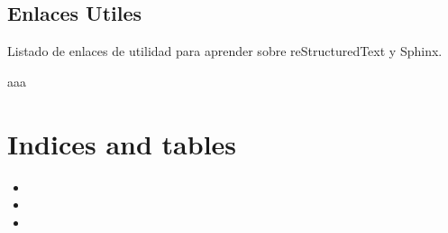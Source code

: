 \documentclass[letterpaper,10pt,spanish]{sphinxmanual}
\begin{document}
\chapter{Enlaces Utiles}
\label{anexo:enlaces-utiles}\label{anexo:id2}
Listado de enlaces de utilidad para aprender sobre reStructuredText y Sphinx.

aaa


\part{Indices and tables}
\label{index:indices-and-tables}\begin{itemize}
\item {} 

\item {} 

\item {} 

\end{itemize}

\begin{thebibliography}{CIT2016}
\end{thebibliography}



\renewcommand{\indexname}{Índice}
\printindex
\end{document}

